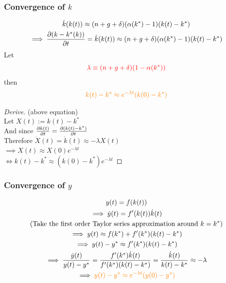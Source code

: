 \documentclass[11pt]{article}
\begin{document}
	    \subsubsection{Convergence of $k$}
	    \begin{gather}
	        \dot{k}(k(t)) \approx (n + g + \delta) (\alpha (k^*) - 1) (k(t) - k^*) \\
	        \implies \frac{\partial{({k - k^*}(k))}}{\partial{t}} = \dot{k}(k(t)) \approx (n + g + \delta) (\alpha (k^*) - 1) (k(t) - k^*)
	    \end{gather}
	    Let 
	    \begin{equation}
	    		\textcolor{red}{
	    		\lambda \equiv (n + g + \delta) (1 - \alpha (k^*))
	    		}
	    \end{equation}
		then 
	    \begin{gather}
	    \textcolor{orange}{
	        k(t) - k^* \approx e^{-\lambda t}(k(0) - k^*)
	    }
	    \end{gather}
	    \begin{remark}
		    \begin{proof}[Derive] (above equation)\\
		        Let $X(t) := k(t) - k^*$ \\
		        And since $\frac{\partial{k(t)}}{\partial{t}} = \frac{\partial{(k(t) - k^*)}}{\partial{t}}$ \\
		        Therefore $\dot{X}(t) = \dot{k}(t) \approx -\lambda X(t)$ \\
		        $\implies X(t) \approx X(0) e^{-\lambda t}$ \\
		        $\iff k(t) - k^* \approx (k(0) - k^*) e^{-\lambda t}$
		    \end{proof}
	    \end{remark}
	    \subsubsection{Convergence of $y$}
	    \begin{gather}
	        y(t) = f(k(t)) \\
	        \implies \dot{y}(t) = f'(k(t))\dot{k}(t) \\
	        \text{{(Take the first order Taylor series approximation around $k=k^*$)}} \\
	        \implies y(t) \approx f(k^*) + f'(k^*) (k(t)-k^*) \\
	        \implies y(t) - y^* \approx f'(k^*)(k(t) - k^*) \\
	        \implies \frac{\dot{y}(t)}{y(t) - y^*} = \frac{f'(k^*)\dot{k}(t)}{f'(k^*)(k(t) - k^*)} = \frac{\dot{k}(t)}{k(t) - k^*} \approx - \lambda \\
	       \implies \textcolor{orange}{
	       		y(t) - y^* \approx e^{- \lambda t} (y(0) - y^*)
	       }
	    \end{gather}
	    
\end{document}
